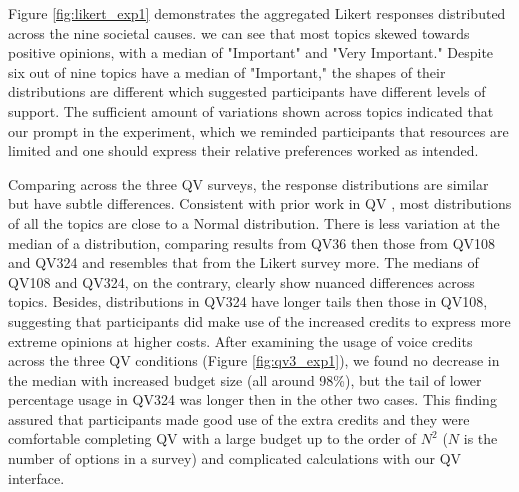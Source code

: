 
Figure \ref{fig:likert_exp1} demonstrates 
the aggregated Likert responses
distributed across the nine societal causes. 
we can see that most topics skewed towards positive opinions, 
with a median of "Important" and "Very Important." 
Despite six out of nine topics have a median of "Important," 
the shapes of their distributions are different which
suggested participants have different levels of support. 
The sufficient amount of variations 
shown across topics indicated that 
our prompt in the experiment, 
which we reminded participants that resources are limited
and one should express their relative preferences 
worked as intended. 

Comparing across the three QV surveys, 
the response distributions are similar 
but have subtle differences. 
Consistent with prior work in QV \cite{quarfoot2017quadratic}, 
most distributions of all the topics 
are close to a Normal distribution.
There is less variation
at the median of a distribution, 
comparing results from QV36 
then those from QV108 and QV324
and resembles that from the Likert survey more.
The medians of QV108 and QV324, on the contrary, 
clearly show nuanced differences across topics. 
Besides, distributions in QV324 
have longer tails 
then those in QV108, 
suggesting that participants 
did make use of the increased credits 
to express more extreme opinions at higher costs. 
After examining
the usage of 
voice credits across the three QV conditions 
(Figure \ref{fig:qv3_exp1}), 
we found no decrease 
in the median with increased budget size (all around 98\%), 
but the tail of lower percentage usage in QV324 was longer 
then in the other two cases. 
This finding assured that 
participants made good use of 
the extra credits 
and they were comfortable 
completing QV with a large budget 
up to the order of $N^2$ ($N$ is the number of options in a survey) 
and complicated calculations with our QV interface. 


